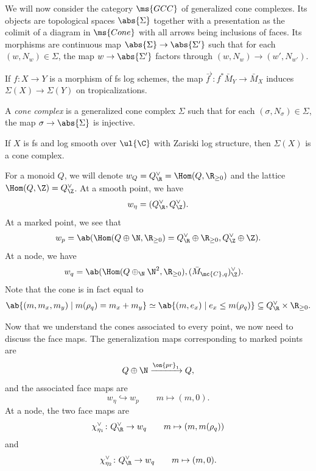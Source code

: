 We will now consider the category \(\ms{GCC}\) of generalized cone complexes. Its objects are topological spaces \(\abs{\Sigma}\) together with a presentation as the colimit of a diagram in \(\ms{Cone}\) with all arrows being inclusions of faces. Its morphisms are continuous map \(\abs{\Sigma} \to \abs{\Sigma'}\) such that for each \((w, N_w) \in \Sigma\), the map \(w \to \abs{\Sigma'}\) factors through \((w, N_w) \to (w', N_{w'})\).

\begin{exm}
    If \(f \colon X \to Y\) is a morphism of fs log schemes, the map \(\bar{f}^{\flat} \colon f^* \bar{M}_Y \to \bar{M}_X\) induces \(\Sigma(X) \to \Sigma(Y)\) on tropicalizations.
\end{exm}

\begin{defn}
    A \textit{cone complex} is a generalized cone complex \(\Sigma\) such that for each \((\sigma, N_{\sigma}) \in \Sigma\), the map \(\sigma \to \abs{\Sigma}\) is injective.
\end{defn}

\begin{thm}
    If \(X\) is fs and log smooth over \(\ul{\C}\) with Zariski log structure, then \(\Sigma(X)\) is a cone complex.
\end{thm}

For a monoid \(Q\), we will denote \(w_Q = Q_{\R}^{\vee} = \Hom(Q, \R_{\geq 0})\) and the lattice \(\Hom(Q, \Z) = Q_{\Z}^{\vee}\). At a smooth point, we have
\[ w_{\eta} = (Q_{\R}^{\vee}, Q_{\Z}^{\vee}). \]
At a marked point, we see that
\[ w_p = \ab(\Hom (Q \oplus \N, \R_{\geq 0}) = Q_{\R}^{\vee} \oplus \R_{\geq 0}, Q_{\Z}^{\vee}\oplus \Z). \]
At a node, we have
\begin{align*}
    w_q &= \ab(\Hom(Q \oplus_{\N} \N^2, \R_{\geq 0}), ( \bar{M}_{\mc{C}, q} )_{\Z}^{\vee}).
\end{align*}
Note that the cone is in fact equal to
\[ \ab\{(m, m_x, m_y) \mid m(\rho_q) = m_x + m_y \} \simeq \ab\{(m, e_x) \mid e_x \leq m(\rho_q) \} \subseteq Q_{\R}^{\vee} \times \R_{\geq 0}. \]

Now that we understand the cones associated to every point, we now need to discuss the face maps. The generalization maps corresponding to marked points are
\[ Q \oplus \N \xrightarrow{\on{pr}_1} Q, \]
and the associated face maps are 
\[ w_{\eta} \hookrightarrow w_p \qquad m \mapsto (m,0). \]
At a node, the two face maps are
\[ \chi_{\eta_1}^{\vee} \colon Q_{\R}^{\vee} \to w_q \qquad m \mapsto (m, m(\rho_q)) \]
and 
\[ \chi_{\eta_2}^{\vee} \colon Q_{\R}^{\vee} \to w_q \qquad m \mapsto (m, 0). \]

